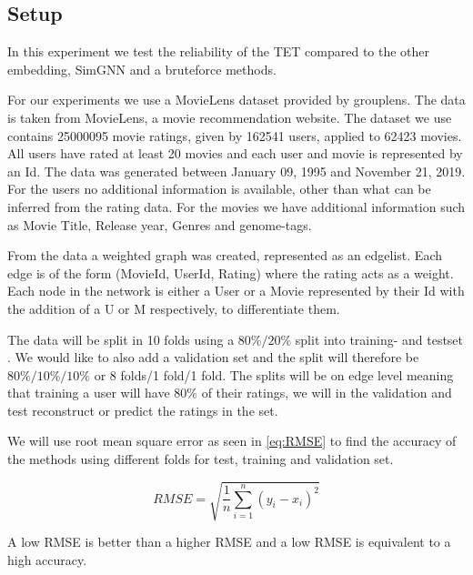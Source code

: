 \subsection{Setup}
In this experiment we test the reliability of the TET compared to the other embedding, SimGNN and a bruteforce methods. 

For our experiments we use a MovieLens dataset provided by grouplens\cite{Grouplensdata}. The data is taken from MovieLens, a movie recommendation website. The dataset we use contains 25000095 movie ratings, given by 162541 users, applied to 62423 movies. All users have rated at least 20 movies and each user and movie is represented by an Id. The data was generated between January 09, 1995 and November 21, 2019. For the users no additional information is available, other than what can be inferred from the rating data. For the movies we have additional information such as Movie Title, Release year, Genres and genome-tags.

From the data a weighted graph was created, represented as an edgelist. Each edge is of the form (MovieId, UserId, Rating) where the rating acts as a weight. Each node in the network is either a User or a Movie represented by their Id with the addition of a U or M respectively, to differentiate them.

The data will be split in 10 folds using a $80\%/20\%$ split into training- and testset \cite{Ricci2015}. We would like to also add a validation set and the split will therefore be $80\%/10\%/10\%$ or 8 folds/1 fold/1 fold. The splits will be on edge level meaning that training a user will have $80\%$ of their ratings, we will in the validation and test reconstruct or predict the ratings in the set.

We will use root mean square error as seen in \autoref{eq:RMSE}\cite{chai2014root} to find the accuracy of the methods using different folds for test, training  and validation set.

\begin{equation}\label{eq:RMSE}
RMSE = \sqrt{\frac{1}{n}\sum^n_{i=1}(y_i - x_i)^2}
\end{equation}

A low RMSE is better than a higher RMSE and a low RMSE is equivalent to a high accuracy.

